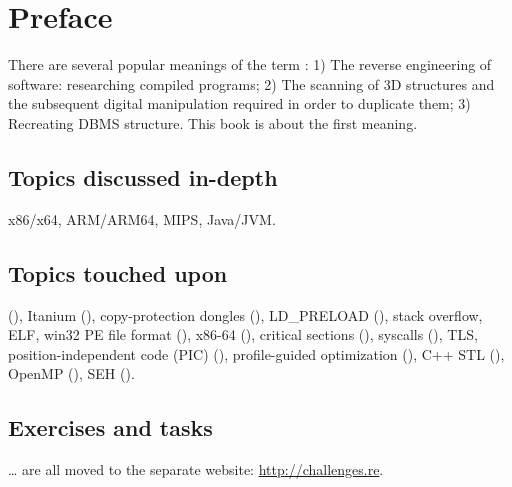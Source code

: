 \section*{Preface}

There are several popular meanings of the term :
1) The reverse engineering of software: researching compiled programs;
2) The scanning of 3D structures and the subsequent digital manipulation required in order to duplicate them;
3) Recreating \ac{DBMS} structure.
This book is about the first meaning.

\subsection*{Topics discussed in-depth}

x86/x64, ARM/ARM64, MIPS, Java/JVM.

\subsection*{Topics touched upon}

\oracle (),
Itanium (),
copy-protection dongles (), 
LD\_PRELOAD (),
stack overflow,
\ac{ELF},
win32 PE file format (),
x86-64 (),
critical sections (),
syscalls (), 
\ac{TLS},
position-independent code (\ac{PIC}) (), 
profile-guided optimization (),
C++ STL (),
OpenMP (),
SEH ().

\subsection*{Exercises and tasks}

\dots 
are all moved to the separate website: \url{http://challenges.re}.

